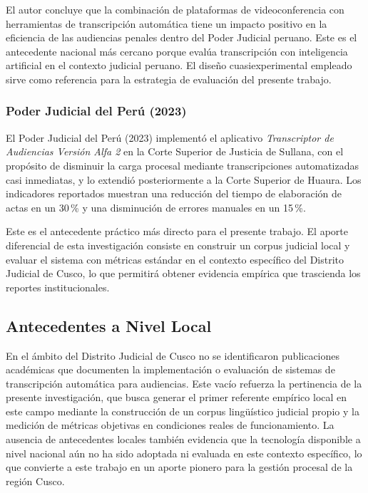 \documentclass[12pt,a4paper,oneside]{article}
\begin{document}
El autor concluye que la combinaci\'on de plataformas de videoconferencia con herramientas de transcripci\'on autom\'atica tiene un impacto positivo en la eficiencia de las audiencias penales dentro del Poder Judicial peruano. Este es el antecedente nacional m\'as cercano porque eval\'ua transcripci\'on con inteligencia artificial en el contexto judicial peruano. El dise\~no cuasiexperimental empleado sirve como referencia para la estrategia de evaluaci\'on del presente trabajo.

\subsubsection{Poder Judicial del Per\'u (2023)}

El Poder Judicial del Per\'u (2023) implement\'o el aplicativo \textit{Transcriptor de Audiencias Versi\'on Alfa 2} en la Corte Superior de Justicia de Sullana, con el prop\'osito de disminuir la carga procesal mediante transcripciones automatizadas casi inmediatas, y lo extendi\'o posteriormente a la Corte Superior de Huaura. Los indicadores reportados muestran una reducci\'on del tiempo de elaboraci\'on de actas en un 30\,\% y una disminuci\'on de errores manuales en un 15\,\%.

Este es el antecedente pr\'actico m\'as directo para el presente trabajo. El aporte diferencial de esta investigaci\'on consiste en construir un corpus judicial local y evaluar el sistema con m\'etricas est\'andar en el contexto espec\'ifico del Distrito Judicial de Cusco, lo que permitir\'a obtener evidencia emp\'irica que trascienda los reportes institucionales.

\subsection{Antecedentes a Nivel Local}

En el \'ambito del Distrito Judicial de Cusco no se identificaron publicaciones acad\'emicas que documenten la implementaci\'on o evaluaci\'on de sistemas de transcripci\'on autom\'atica para audiencias. Este vac\'io refuerza la pertinencia de la presente investigaci\'on, que busca generar el primer referente emp\'irico local en este campo mediante la construcci\'on de un corpus ling\"u\'istico judicial propio y la medici\'on de m\'etricas objetivas en condiciones reales de funcionamiento. La ausencia de antecedentes locales tambi\'en evidencia que la tecnolog\'ia disponible a nivel nacional a\'un no ha sido adoptada ni evaluada en este contexto espec\'ifico, lo que convierte a este trabajo en un aporte pionero para la gesti\'on procesal de la regi\'on Cusco.
\end{document}
